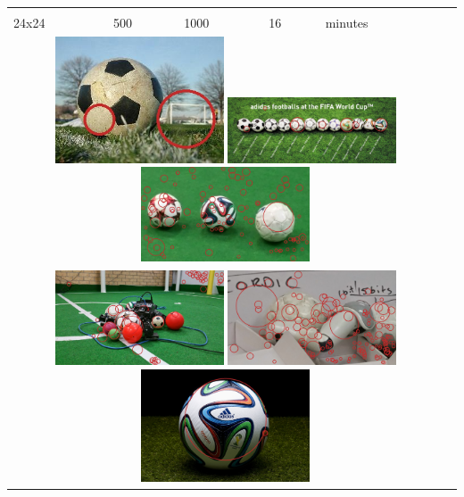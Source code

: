 \begin{tabularx}{\textwidth}{llllll}
{    } \\
    24x24 & 500 & 1000 & 16 & \mytilda2 minutes \\
    \multicolumn{5}{c}{
        \includegraphics[width=5.0cm]{results/2/sphere_3}
        \includegraphics[width=5.0cm]{results/2/sphere_4}
        \includegraphics[width=5.0cm]{results/2/sphere_5}
    } \\
    \multicolumn{5}{c}{
        \includegraphics[width=5.0cm]{results/2/sphere_6}
        \includegraphics[width=5.0cm]{results/2/sphere_7}
        \includegraphics[width=5.0cm]{results/2/sphere_8}
    } \\

\end{tabularx}
